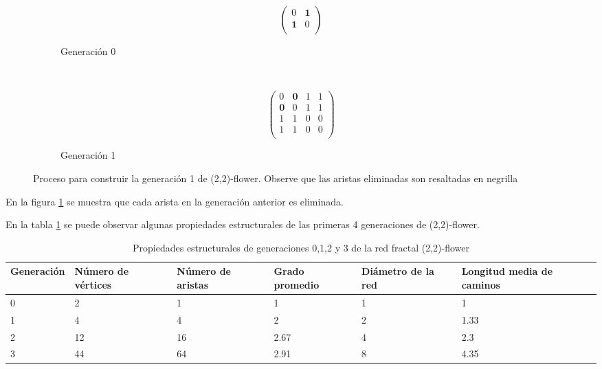 \begin{figure}[H]
    \centering
     \begin{subfigure}[b]{0.25\textwidth}
\[ 
\left( \begin{array}{cc}
 0& \textbf{1}  \\ 
\textbf{1} &  0 \\
\end{array} \right)\]
\caption{Generación 0}
 \end{subfigure}~ \begin{subfigure}[b]{0.25\textwidth}
 \[ \left( \begin{array}{cccc}
 0 &  \textbf{0} & 1 & 1  \\ 
\textbf{0} & 0 & 1 & 1\\
 1 & 1 & 0 & 0 \\
 1 & 1 & 0 & 0\\
\end{array} \right)\]
\caption{Generación 1}
     \end{subfigure}
    \caption{Proceso para construir la generación 1 de (2,2)-flower. Observe que las aristas eliminadas son resaltadas en negrilla}
    \label{fig:redesfractalesA}
\end{figure}

En la figura \ref{fig:redesfractalesA} se muestra  que cada arista en la generación anterior es eliminada.

En la tabla  \ref{tab:flower22} se puede observar algunas propiedades estructurales de las primeras 4 generaciones de (2,2)-flower.
\begin{table}[H]
    \centering
    \begin{tabular}{|p{2cm}|p{2cm}|p{2cm}|p{2cm}|p{2cm}|p{3cm}|}
    \hline
        \textbf{Generación} & \textbf{Número de vértices} & \textbf{Número de aristas} & \textbf{Grado promedio} & \textbf{Diámetro de la red} & \textbf{Longitud media de caminos}\\
        \hline
        0 &2 & 1 & 1 & 1 & 1\\
        \hline
        1 &4 & 4 & 2 & 2 & 1.33\\
        \hline
        2 &12 &16 &2.67 & 4 & 2.3\\
        \hline
        3 &44 &64 & 2.91 & 8& 4.35 \\
        \hline
    \end{tabular}
    \caption{Propiedades estructurales de generaciones 0,1,2 y 3 de la red fractal (2,2)-flower}
    \label{tab:flower22}
\end{table}


